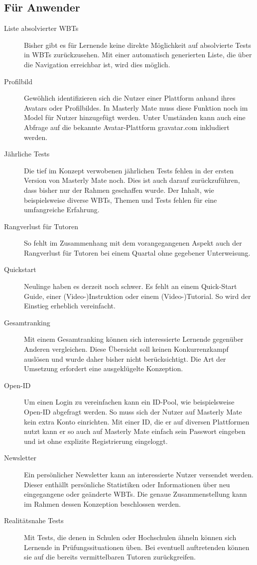 \subsection{Für Anwender}
\begin{description}
\item[Liste absolvierter WBTs] Bisher gibt es für Lernende keine
direkte Möglichkeit auf absolvierte Tests in WBTs zurückzusehen. Mit einer
automatisch generierten Liste, die über die Navigation erreichbar ist, wird dies
möglich.
\item[Profilbild] Gewöhlich identifizieren sich die Nutzer einer Plattform
anhand ihres Avatars oder Profilbildes. In Masterly Mate muss diese Funktion
noch im Model für Nutzer hinzugefügt werden. Unter Umständen kann auch eine
Abfrage auf die bekannte Avatar-Plattform gravatar.com inkludiert werden.
\item[Jährliche Tests] Die tief im Konzept verwobenen jährlichen Tests fehlen in
der ersten Version von Masterly Mate noch. Dies ist auch darauf zurückzuführen,
dass bisher nur der Rahmen geschaffen wurde. Der Inhalt, wie beispielsweise
diverse WBTs, Themen und Tests fehlen für eine umfangreiche Erfahrung.
\item[Rangverlust für Tutoren] So fehlt im Zusammenhang mit dem
vorangegangenen Aspekt auch der Rangverlust für Tutoren bei einem Quartal
ohne gegebener Unterweisung.
\item[Quickstart] Neulinge haben es derzeit noch schwer. Es fehlt an
einem Quick-Start Guide, einer (Video-)Instruktion oder einem (Video-)Tutorial.
So wird der Einstieg erheblich vereinfacht.
\item[Gesamtranking] Mit einem Gesamtranking können sich
interessierte Lernende gegenüber Anderen vergleichen. Diese Übersicht
soll keinen Konkurrenzkampf auslösen und wurde daher bisher nicht
berücksichtigt. Die Art der Umsetzung erfordert eine ausgeklügelte
Konzeption.
\item[Open-ID] Um einen Login zu vereinfachen kann ein ID-Pool, wie
beispielsweise Open-ID abgefragt werden. So muss sich der Nutzer auf
Masterly Mate kein extra Konto einrichten. Mit einer ID, die er auf
diversen Plattformen nutzt kann er so auch auf Masterly Mate einfach
sein Passwort eingeben und ist ohne explizite Registrierung
eingeloggt.
\item[Newsletter] Ein persönlicher Newsletter kann an
interessierte Nutzer versendet werden. Dieser enthällt
persönliche Statistiken oder Informationen über neu
eingegangene oder geänderte WBTs. Die genaue Zusammenstellung kann im Rahmen
dessen Konzeption beschlossen werden.
\item[Realitätsnahe Tests] Mit Tests, die denen in Schulen oder Hochschulen
ähneln können sich Lernende in Prüfungssituationen üben. Bei eventuell
auftretenden können sie auf die bereits vermittelbaren Tutoren zurückgreifen. 
\end{description}

